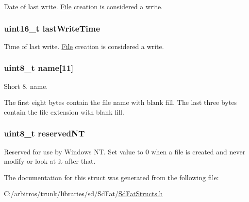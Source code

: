 Date of last write. \hyperlink{class_file}{File} creation is considered a write. \hypertarget{structdirectory_entry_ab140bb773b2ff0ddf7199efc083ce037}{
\subsubsection[{last\-Write\-Time}]{\setlength{\rightskip}{0pt plus 5cm}uint16\-\_\-t last\-Write\-Time}}\label{structdirectory_entry_ab140bb773b2ff0ddf7199efc083ce037}
Time of last write. \hyperlink{class_file}{File} creation is considered a write. \hypertarget{structdirectory_entry_a30308c9b983377042fd2cc8900454fb1}{
\subsubsection[{name}]{\setlength{\rightskip}{0pt plus 5cm}uint8\-\_\-t name\mbox{[}11\mbox{]}}}\label{structdirectory_entry_a30308c9b983377042fd2cc8900454fb1}
Short 8. name.

The first eight bytes contain the file name with blank fill. The last three bytes contain the file extension with blank fill. \hypertarget{structdirectory_entry_a937b2d2e4b78ddf9e42b19c754e4f31a}{
\subsubsection[{reserved\-N\-T}]{\setlength{\rightskip}{0pt plus 5cm}uint8\-\_\-t reserved\-N\-T}}\label{structdirectory_entry_a937b2d2e4b78ddf9e42b19c754e4f31a}
Reserved for use by Windows N\-T. Set value to 0 when a file is created and never modify or look at it after that. 

The documentation for this struct was generated from the following file\-:\begin{DoxyCompactItemize}
\item 
C\-:/arbitros/trunk/libraries/sd/\-Sd\-Fat/\hyperlink{_sd_fat_structs_8h}{Sd\-Fat\-Structs.\-h}\end{DoxyCompactItemize}
